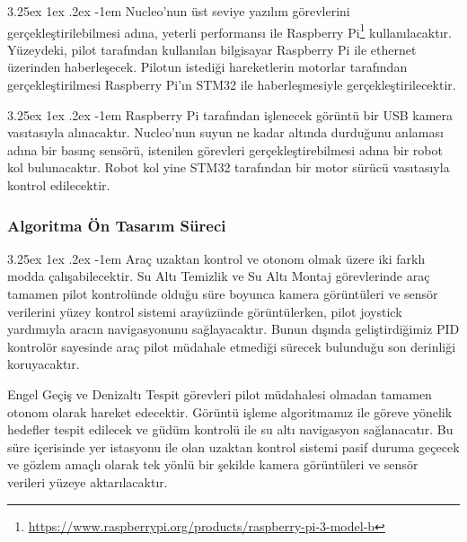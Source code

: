 \documentclass[12pt]{article}
\makeatletter
\newcounter{subsubsubsection}[subsubsection]
\renewcommand\paragraph{\@startsection{paragraph}{5}{\z@}%
  {3.25ex \@plus1ex \@minus.2ex}%
  {-1em}%
  {\normalfont\normalsize\bfseries}}
\makeatother
\begin{document}
\paragraph{} Nucleo'nun üst seviye yazılım görevlerini gerçekleştirilebilmesi adına, yeterli performansı ile Raspberry Pi\footnote{\href{https://www.raspberrypi.org/products/raspberry-pi-3-model-b}{https://www.raspberrypi.org/products/raspberry-pi-3-model-b}} kullanılacaktır. Yüzeydeki, pilot tarafından kullanılan bilgisayar Raspberry Pi ile ethernet üzerinden haberleşecek. Pilotun istediği hareketlerin motorlar tarafından gerçekleştirilmesi Raspberry Pi'ın STM32 ile haberleşmesiyle gerçekleştirilecektir.



\paragraph{} Raspberry Pi tarafından işlenecek görüntü bir USB kamera vasıtasıyla alınacaktır. Nucleo'nun suyun ne kadar altında durduğunu anlaması adına bir basınç sensörü, istenilen görevleri gerçekleştirebilmesi adına bir robot kol bulunacaktır. Robot kol yine STM32 tarafından bir motor sürücü vasıtasıyla kontrol edilecektir.

\subsubsection{Algoritma Ön Tasarım Süreci}

\paragraph{} Araç uzaktan kontrol ve otonom olmak üzere iki farklı modda çalışabilecektir. Su Altı Temizlik ve Su Altı Montaj görevlerinde araç tamamen pilot kontrolünde olduğu süre boyunca kamera görüntüleri ve sensör verilerini yüzey kontrol sistemi arayüzünde görüntülerken, pilot joystick yardımıyla aracın navigasyonunu sağlayacaktır. Bunun dışında geliştirdiğimiz PID kontrolör sayesinde araç pilot müdahale etmediği sürecek bulunduğu son derinliği koruyacaktır.

Engel Geçiş ve Denizaltı Tespit görevleri pilot müdahalesi olmadan tamamen otonom olarak hareket edecektir. Görüntü işleme algoritmamız ile göreve yönelik hedefler tespit edilecek ve güdüm kontrolü ile su altı navigasyon sağlanacatır. Bu süre içerisinde yer istasyonu ile olan uzaktan kontrol sistemi pasif duruma geçecek ve gözlem amaçlı olarak tek yönlü bir şekilde kamera görüntüleri ve sensör verileri yüzeye aktarılacaktır.
\end{document}
